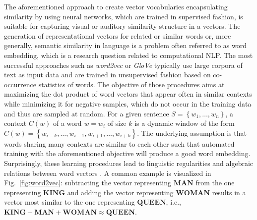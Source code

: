 The aforementioned approach to create vector vocabularies encapsulating similarity by using neural networks, which are trained in supervised fashion, is suitable for capturing visual or auditory similarity structure in a vectors.
The generation of representational vectors for related or similar words or, more generally, semantic similarity in language is a problem often referred to as word embedding, which is a research question related to computational \acf{NLP}.
The most successful approaches such as \textit{word2vec} \parencite{Mikolov2013a, Mikolov2013} or \textit{\ac{GloVe}} \parencite{Pennington2014} typically use large corpora of text as input data and are trained in unsupervised fashion based on co-occurrence statistics of words.
The objective of those procedures aims at maximizing the dot product of word vectors that appear often in similar contexts while minimizing it for negative samples, which do not occur in the training data and thus are sampled at random.
For a given sentence $S=\left\{w_1, \ldots, w_n\right\}$, a context $C(w)$ of a word $w=w_i$ of size $k$ is a dynamic window of the form $C(w) = \left\{ w_{i-k}, \ldots, w_{i-1}, w_{i+1}, \ldots, w_{i+k}\right\}$.
The underlying assumption is that words sharing many contexts are similar to each other such that automated training with the aforementioned objective will produce a good word embedding.
Surprisingly, these learning procedures lead to linguistic regularities and algebraic relations between word vectors \parencite{Mikolov2013b}.
A common example is visualized in Fig.~\ref{fig:word2vec}: subtracting the vector representing $\mathbf{MAN}$ from the one representing $\mathbf{KING}$ and adding the vector representing $\mathbf{WOMAN}$ results in a vector most similar to the one representing $\mathbf{QUEEN}$, i.e., $\mathbf{KING} - \mathbf{MAN} + \mathbf{WOMAN} \approx \mathbf{QUEEN}$.
